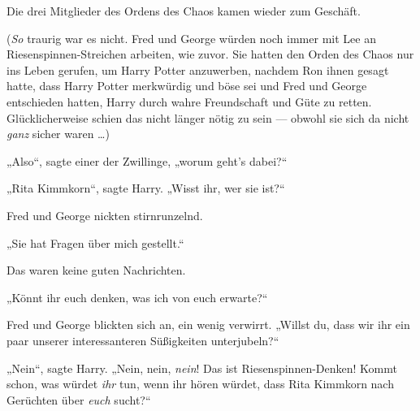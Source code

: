 Die drei Mitglieder des Ordens des Chaos kamen wieder zum Geschäft.

(\emph{So} traurig war es nicht. Fred und George würden noch immer mit Lee an Riesenspinnen-Streichen arbeiten, wie zuvor. Sie hatten den Orden des Chaos nur ins Leben gerufen, um Harry Potter anzuwerben, nachdem Ron ihnen gesagt hatte, dass Harry Potter merkwürdig und böse sei und Fred und George entschieden hatten, Harry durch wahre Freundschaft und Güte zu retten. Glücklicherweise schien das nicht länger nötig zu sein — obwohl sie sich da nicht \emph{ganz} sicher waren …)

„Also“, sagte einer der Zwillinge, „worum geht’s dabei?“

„Rita Kimmkorn“, sagte Harry.
„Wisst ihr, wer sie ist?“

Fred und George nickten stirnrunzelnd.

„Sie hat Fragen über mich gestellt.“

Das waren keine guten Nachrichten.

„Könnt ihr euch denken, was ich von euch erwarte?“

Fred und George blickten sich an, ein wenig verwirrt.
„Willst du, dass wir ihr ein paar unserer interessanteren Süßigkeiten unterjubeln?“

„Nein“, sagte Harry.
„Nein, nein, \emph{nein}! Das ist Riesenspinnen-Denken! Kommt schon, was würdet \emph{ihr} tun, wenn ihr hören würdet, dass Rita Kimmkorn nach Gerüchten über \emph{euch} sucht?“

